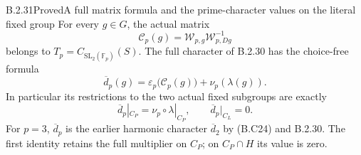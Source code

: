 \begin{result}{B.2.31}{Proved}{A full matrix formula and the prime-character values on the literal fixed group}
For every $g\in G$, the actual matrix
\[
 \mathscr C_p(g)=\mathcal W_{p,g}\mathcal W_{p,Dg}^{-1}
\]
belongs to $T_p=C_{\mathrm{SL}_2(\mathbb F_p)}(S)$.
The full character of B.2.30 has the choice-free formula
\[
 \boxed{\quad
 \overline d_p(g)=\varepsilon_p\bigl(\mathscr C_p(g)\bigr)
                                      +\nu_p(\lambda(g)).
 \quad}                                                         \tag{B.AD2}
\]
In particular its restrictions to the two actual fixed
subgroups are exactly
\[
 \overline d_p|_{C_P}=\nu_p\circ\lambda|_{C_P},
 \qquad \overline d_p|_{C_L}=0.                                 \tag{B.AD3}
\]
For $p=3$, $\overline d_p$ is the earlier harmonic character
$\overline d_2$ by (B.C24) and B.2.30.
The first identity retains the full multiplier on $C_P$;
on $C_P\cap H$ its value is zero.
\end{result}
